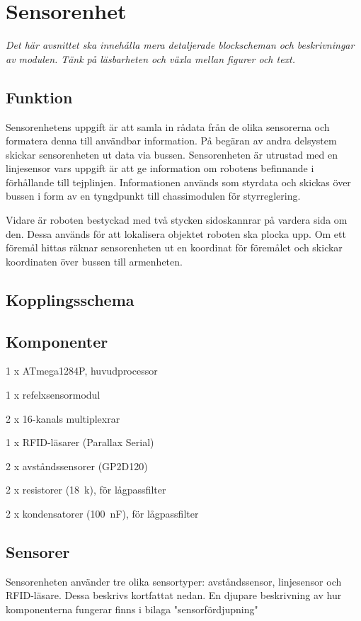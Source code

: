 \section{Sensorenhet}
\emph{Det här avsnittet ska innehålla mera detaljerade blockscheman och beskrivningar av modulen.
Tänk på läsbarheten och växla mellan figurer och text.}

\subsection{Funktion}
Sensorenhetens uppgift är att samla in rådata från de olika sensorerna och formatera denna till användbar information. På begäran av andra delsystem skickar sensorenheten ut data via bussen. Sensorenheten är utrustad
med en linjesensor vars uppgift är att ge information om robotens befinnande i förhållande till tejplinjen. Informationen används som styrdata och skickas över bussen i form av en tyngdpunkt till chassimodulen för styrreglering.

Vidare är roboten bestyckad med två stycken sidoskannrar på vardera sida om den. Dessa används för att lokalisera objektet roboten ska plocka upp. Om ett föremål hittas räknar sensorenheten ut en koordinat för föremålet och skickar koordinaten över bussen till armenheten.

\subsection{Kopplingsschema}

\subsection{Komponenter}
\begin{packed_itemize}
\item 1 x ATmega1284P, huvudprocessor
\item 1 x refelxsensormodul
\item 2 x 16-kanals multiplexrar
\item 1 x RFID-läsarer (Parallax Serial)
\item 2 x avståndssensorer (GP2D120)
\item 2 x resistorer (18~k\ohm), för lågpassfilter
\item 2 x kondensatorer (100~nF), för lågpassfilter
\end{packed_itemize}

\subsection{Sensorer}
Sensorenheten använder tre olika sensortyper: avståndssensor, linjesensor och RFID-läsare.
Dessa beskrivs kortfattat nedan. En djupare beskrivning av hur komponenterna fungerar finns i bilaga "sensorfördjupning"

